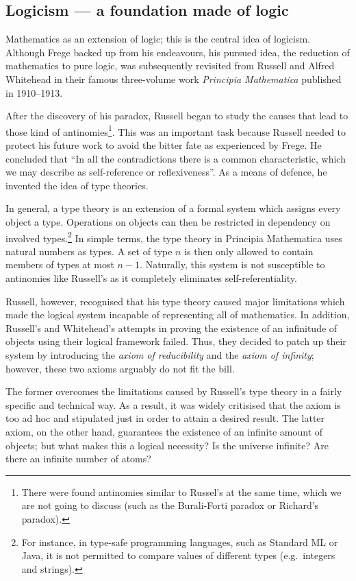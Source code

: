 \documentclass[hidelinks]{article}
\begin{document}
\subsection{Logicism --- a foundation made of logic}\label{ssec_logicism}
Mathematics as an extension of logic; this is the central idea of logicism. Although Frege backed up from his endeavours, his pursued idea, the reduction of mathematics to pure logic, was subsequently revisited from Russell and Alfred Whitehead in their famous three-volume work \textit{Principia Mathematica} published in 1910--1913.

After the discovery of his paradox, Russell began to study the causes that lead to those kind of antinomies\footnote{There were found antinomies similar to Russel's at the same time, which we are not going to discuss (such as the Burali-Forti paradox or Richard's paradox).\cite{russell_self_referentiality}}. This was an important task because Russell needed to protect his future work to avoid the bitter fate as experienced by Frege. He concluded that ``In all the contradictions there is a common characteristic, which we may describe as self-reference or reflexiveness''\cite[p. 224]{russell_self_referentiality}. As a means of defence, he invented the idea of type theories. 

In general, a type theory is an extension of a formal system which assigns every object a type. Operations on objects can then be restricted in dependency on involved types.\footnote{For instance, in type-safe programming languages, such as Standard ML or Java, it is not permitted to compare values of different types (e.g.\ integers and strings).} In simple terms, the type theory in Principia Mathematica uses natural numbers as types. A set of type $n$ is then only allowed to contain members of types at most $n-1$. Naturally, this system is not susceptible to antinomies like Russell's as it completely eliminates self-referentiality. 

Russell, however, recognised that his type theory caused major limitations which made the logical system incapable of representing all of mathematics. In addition, Russell's and Whitehead's attempts in proving the existence of an infinitude of objects using their logical framework failed. Thus, they decided to patch up their system by introducing the \textit{axiom of reducibility} and the \textit{axiom of infinity}; however, these two axioms arguably do not fit the bill.

The former overcomes the limitations caused by Russell's type theory in a fairly specific and technical way. As a result, it was widely critisised that the axiom is too ad hoc and stipulated just in order to attain a desired result.
The latter axiom, on the other hand, guarantees the existence of an infinite amount of objects; but what makes this a logical necessity? Is the universe infinite? Are there an infinite number of atoms?
\end{document}
